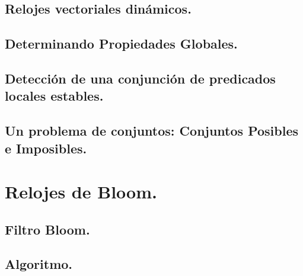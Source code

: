 \documentclass[9pt]{beamer}
\begin{document}
\subsection{Relojes vectoriales dinámicos.}   %


\subsection{Determinando Propiedades Globales.}




\subsection{Detección de una conjunción de predicados locales estables.}


\subsection{Un problema de conjuntos: Conjuntos Posibles e Imposibles.}



\section{Relojes de Bloom.}
\subsection{Filtro Bloom.}



\subsection{Algoritmo.}



\end{document}
